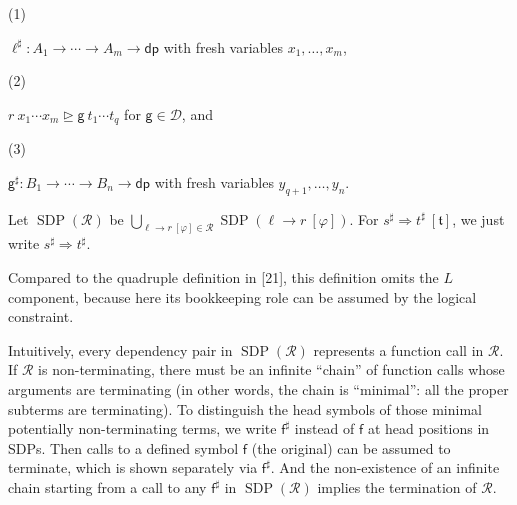 \par\noindent  (1) 
 
$\ell^{\sharp}:{A}_{1}\rightarrow\cdots\rightarrow{A}_{m}\rightarrow\mathsf{dp}$ with fresh variables ${x}_{1},\ldots,{x}_{m}$,\par
 
 
 
\par\noindent  (2) 
 
${r}\ {{x}_{1}\cdots{x}_{m}}\trianglerighteq{\mathsf{g}}\ {{t}_{1}\cdots{t}_{q}}$ for $\mathsf{g}\in\mathcal{D}$, and\par
 
 
 
\par\noindent  (3) 
 
$\mathsf{g}^{\sharp}:{B}_{1}\rightarrow\cdots\rightarrow{B}_{n}\rightarrow\mathsf{dp}$ with fresh variables ${y}_{q+1},\ldots,{y}_{n}$.\par
 
 
  
Let $\operatorname{SDP}(\mathcal{R})$ be $\bigcup_{{\ell}\rightarrow{r}\ [\varphi]\in\mathcal{R}}\operatorname{SDP}({\ell}\rightarrow{r}\ [\varphi])$. For ${s^{\sharp}}\Rightarrow{t^{\sharp}}\ [\mathfrak{t}]$, we just write ${s^{\sharp}}\Rightarrow{t^{\sharp}}$.\par
 
 
 
 
Compared to the quadruple definition in [21], this definition omits the $L$ component, because here its bookkeeping role can be assumed by the logical constraint.\par
 
 
 
Intuitively, every dependency pair in $\operatorname{SDP}(\mathcal{R})$ represents a function call in $\mathcal{R}$. If $\mathcal{R}$ is non-terminating, there must be an infinite “chain” of function calls whose arguments are terminating (in other words, the chain is “minimal”: all the proper subterms are terminating). To distinguish the head symbols of those minimal potentially non-terminating terms, we write $\mathsf{f}^{\sharp}$ instead of $\mathsf{f}$ at head positions in SDPs. Then calls to a defined symbol $\mathsf{f}$ (the original) can be assumed to terminate, which is shown separately via $\mathsf{f}^{\sharp}$. And the non-existence of an infinite chain starting from a call to any $\mathsf{f}^{\sharp}$ in $\operatorname{SDP}(\mathcal{R})$ implies the termination of $\mathcal{R}$.\par
 
